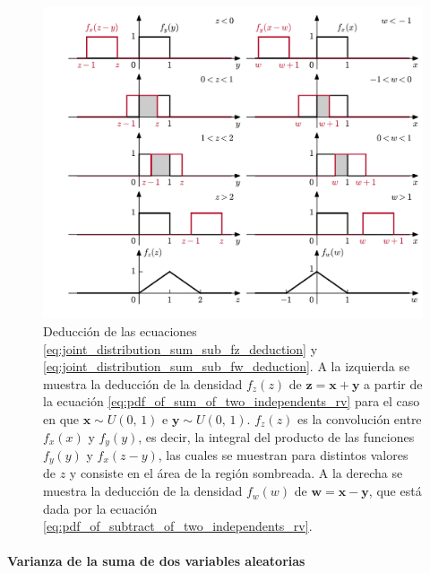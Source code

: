 \documentclass[a4paper]{report}
\newcommand{\x}{\mathbf{x}}
\newcommand{\y}{\mathbf{y}}
\newcommand{\w}{\mathbf{w}}
\newcommand{\z}{\mathbf{z}}
\begin{document}
\begin{figure}[!htb]
\begin{center}
 \includegraphics[width=1\columnwidth]{figuras/joint_distribution_sum_sub_marginals_convolutions.pdf}
\caption{\label{fig:joint_distribution_sum_sub_marginals_convolutions} Deducción de las ecuaciones \ref{eq:joint_distribution_sum_sub_fz_deduction} y \ref{eq:joint_distribution_sum_sub_fw_deduction}. A la izquierda se muestra la deducción de la densidad \(f_z(z)\) de \(\z=\x+\y\) a partir de la ecuación \ref{eq:pdf_of_sum_of_two_independents_rv} para el caso en que \(\x\sim U(0,\,1)\) e \(\y\sim U(0,\,1)\). \(f_z(z)\) es la convolución entre \(f_x(x)\) y \(f_y(y)\), es decir, la integral del producto de las funciones \(f_y(y)\) y \(f_x(z-y)\), las cuales se muestran para distintos valores de \(z\) y consiste en el área de la región sombreada. A la derecha se muestra la deducción de la densidad \(f_w(w)\) de \(\w=\x-\y\), que está dada por la ecuación \ref{eq:pdf_of_subtract_of_two_independents_rv}.}
\end{center}
\end{figure}

\paragraph{Varianza de la suma de dos variables aleatorias}
\end{document}
